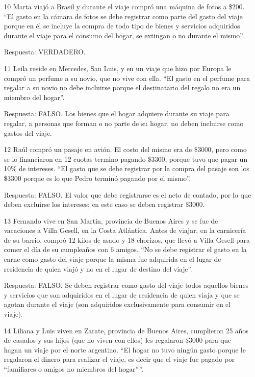 \documentclass[
  openany]{book}
\begin{document}
10 Marta viajó a Brasil y durante el viaje compró una máquina de fotos a \$200.
``El gasto en la cámara de fotos se debe registrar como parte del gasto del viaje porque en él se incluye la compra de todo tipo de bienes y servicios adquiridos durante el viaje para el consumo del hogar, se extingan o no durante el mismo''.

Respuesta: VERDADERO.

11 Leila reside en Mercedes, San Luis, y en un viaje que hizo por Europa le compró un perfume a su novio, que no vive con ella.
``El gasto en el perfume para regalar a su novio no debe incluirse porque el destinatario del regalo no era un miembro del hogar''.

Respuesta: FALSO. Los bienes que el hogar adquiere durante su viaje para regalar, a personas que forman o no parte de su hogar, no deben incluirse como gastos del viaje.

12 Raúl compró un pasaje en avión. El costo del mismo era de \$3000, pero como se lo financiaron en 12 cuotas termino pagando \$3300, porque tuvo que pagar un 10\% de intereses.
``El gasto que se debe registrar por la compra del pasaje son los \$3300 porque es lo que Pedro terminó pagando por el mismo''.

Respuesta: FALSO. El valor que debe registrarse es el neto de contado, por lo que deben excluirse los intereses; en este caso se deben registrar \$3000.

13 Fernando vive en San Martín, provincia de Buenos Aires y se fue de vacaciones a Villa Gesell, en la Costa Atlántica. Antes de viajar, en la carnicería de su barrio, compró 12 kilos de asado y 18 chorizos, que llevó a Villa Gesell para comer el día de su cumpleaños con 6 amigos.
``No se debe registrar el gasto en la carne como gasto del viaje porque la misma fue adquirida en el lugar de residencia de quien viajó y no en el lugar de destino del viaje''.

Respuesta: FALSO. Se deben registrar como gasto del viaje todos aquellos bienes y servicios que son adquiridos en el lugar de residencia de quien viaja y que se agotan durante el viaje (son adquiridos exclusivamente para consumir en el viaje).

14 Liliana y Luis viven en Zarate, provincia de Buenos Aires, cumplieron 25 años de casados y sus hijos (que no viven con ellos) les regalaron \$3000 para que hagan un viaje por el norte argentino.
``El hogar no tuvo ningún gasto porque le regalaron el dinero para realizar el viaje, es decir que el viaje fue pagado por ``familiares o amigos no miembros del hogar''''.
\end{document}
